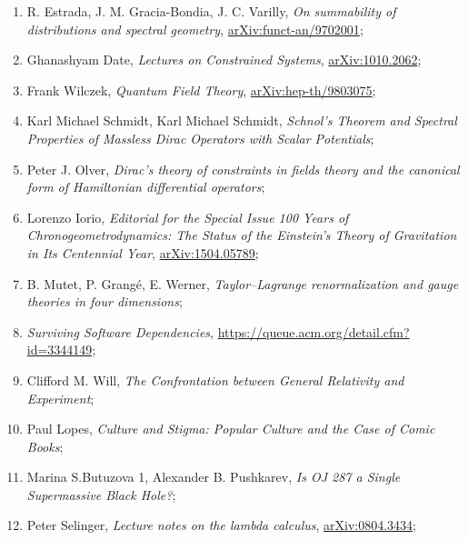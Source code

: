 \documentclass[a4paper,11pt]{article}
\begin{document}
\begin{enumerate}
\item R. Estrada, J. M. Gracia-Bondia, J. C. Varilly, \emph{On
    summability of distributions and spectral geometry},
  \href{https://arxiv.org/abs/funct-an/9702001v1}{arXiv:funct-an/9702001};

\item Ghanashyam Date, \emph{Lectures on Constrained Systems},
  \href{https://arxiv.org/abs/1010.2062v1}{arXiv:1010.2062};

\item Frank Wilczek, \emph{Quantum Field Theory},
  \href{https://arxiv.org/abs/hep-th/9803075v2}{arXiv:hep-th/9803075};

\item Karl Michael Schmidt, Karl Michael Schmidt, \emph{Schnol’s
    Theorem and Spectral Properties of Massless Dirac Operators with
    Scalar Potentials};

\item Peter J. Olver, \emph{Dirac’s theory of constraints in fields
    theory and the canonical form of Hamiltonian differential
    operators};


\item Lorenzo Iorio, \emph{Editorial for the Special Issue 100 Years
    of Chronogeometrodynamics: The Status of the Einstein's Theory of
    Gravitation in Its Centennial Year},
  \href{https://arxiv.org/abs/1504.05789v2}{arXiv:1504.05789};

\item B. Mutet, P. Grang\'{e}, E. Werner, \emph{Taylor–Lagrange
    renormalization and gauge theories in four dimensions};


\item \emph{Surviving Software Dependencies},
  \href{https://queue.acm.org/detail.cfm?id=3344149}{https://queue.acm.org/detail.cfm?id=3344149};

\item Clifford M. Will, \emph{The Confrontation between General
    Relativity and Experiment};

\item Paul Lopes, \emph{Culture and Stigma: Popular Culture and the
    Case of Comic Books};

\item Marina S.Butuzova 1, Alexander B. Pushkarev, \emph{Is OJ 287 a
    Single Supermassive Black Hole?};

\item Peter Selinger, \emph{Lecture notes on the lambda calculus},
  \href{https://arxiv.org/abs/0804.3434v2}{arXiv:0804.3434};


\end{enumerate}
\end{document}
